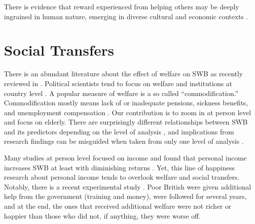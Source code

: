 \documentclass[10pt, letterpaper]{article}
\begin{document}
\begin{spacing}{1.4}
There is evidence that reward experienced from helping others may be deeply
ingrained in human nature, emerging in diverse cultural and economic contexts \citep{aknin13}.

\section{Social Transfers}

There is an abundant literature about the effect of welfare on SWB as recently
reviewed in \citet{aokJap14}. {Political scientists tend to focus on welfare and institutions at country
level \citep{alvarez09,pacek08b,radcliff13,pacek08r,radcliff01,bok10}. A popular
measure of welfare is a so called ``commodification.'' %
Commodification mostly means lack of or inadequate pensions, sickness benefits,
and unemployment compensation \citep{scruggs06Ba}. Our contribution is to zoom
in at person level and focus on elderly.} %
%
 There are surprisingly different relationships between SWB and its predictors
 depending on the level of analysis \citep{ashkanasy11}, and implications from research findings can be
misguided when taken from only one level of analysis \citep{klein00}.

Many studies at person level focused on income and found that 
personal  income  increases SWB at least with diminishing returns
\citep{aok_ruut_inc_ine,kahneman10,frijters04,kushlev15,dolan08al,veenhoven12}. Yet,
this line of happiness research about personal income tends to overlook welfare
and social transfers.
%
Notably, there is a recent experimental study \citep{oswald14}. Poor British
were given additional help from the government (training and money),  
were followed for several years, and at the end, the ones that received
additional welfare were not richer or happier than those who did not, if anything, they
were worse off. 


\end{spacing}
\end{document}
